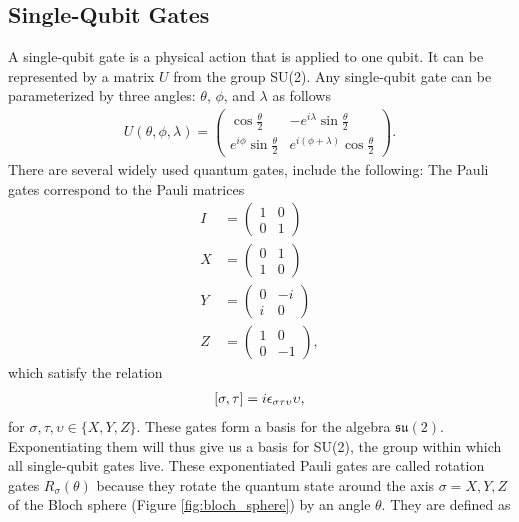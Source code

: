 \documentclass[10pt]{article}
\begin{document}
\subsection{Single-Qubit Gates}

A single-qubit gate is a physical action that is applied to one qubit. It can be represented by a matrix $U$ from the group SU(2). Any single-qubit gate can be parameterized by three angles: $\theta$, $\phi$, and $\lambda$ as follows
\begin{align}
\label{U}
U(\theta,\phi,\lambda)
=
\begin{pmatrix}
\cos\frac{\theta}{2} & -e^{i\lambda}\sin\frac{\theta}{2}
\\
e^{i\phi}\sin\frac{\theta}{2} & e^{i(\phi+\lambda)}\cos\frac{\theta}{2}
\end{pmatrix}
.\end{align}
There are several widely used quantum gates, include the following:
The Pauli gates correspond to the Pauli matrices
\begin{align}
I
&=
\begin{pmatrix}
1 & 0 \\
0 & 1
\end{pmatrix}
\\
X
&=
\begin{pmatrix}
0 & 1 \\
1 & 0
\end{pmatrix}
\\
Y
&=
\begin{pmatrix}
0 & -i \\
i & 0
\end{pmatrix}
\\
Z
&=
\begin{pmatrix}
1 & 0 \\
0 & -1
\end{pmatrix}
,\end{align}
which satisfy the relation
\begin{align}
\comm{\sigma}{\tau}=i\epsilon_{\sigma\tau\upsilon}\upsilon
,\end{align}
for $\sigma,\tau,\upsilon\in\{X,Y,Z\}$. These gates form a basis for the algebra $\mathfrak{su}(2)$. Exponentiating them will thus give us a basis for SU(2), the group within which all single-qubit gates live. These exponentiated Pauli gates are called rotation gates $R_{\sigma}(\theta)$ because they rotate the quantum state around the axis $\sigma=X,Y,Z$ of the Bloch sphere (Figure \ref{fig:bloch_sphere}) by an angle $\theta$. They are defined as
\end{document}
